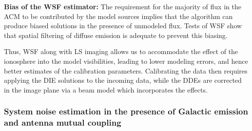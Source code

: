 \documentclass{aa}
\begin{document}
\begin{table}[tbh]
\caption{Flux ratios of bright sources within snapshot from Obs. 3.}
\label{tab:Flux-ratios-of-1}
\end{table}


\textbf{Bias of the WSF estimator:} The  requirement for the majority of flux in
the ACM  to be contributed by the  model sources implies that  the algorithm can
produce biased solutions  in the presence of unmodeled flux.   Tests of WSF show
that spatial filtering of diffuse emission is adequate to prevent this biasing.

Thus,  WSF along with  LS imaging  allows us  to accommodate  the effect  of the
ionosphere into  the model visibilities,  leading to lower modeling  errors, and
hence better estimates of the calibration parameters.  Calibrating the data then
requires applying  the DIE solutions  to the incoming  data, while the  DDEs are
corrected in the image plane via a beam model which incorporates the effects.

\subsubsection{\label{sub:System-noise-estimation}System noise estimation in the
presence of Galactic emission and antenna mutual coupling}
\end{document}
